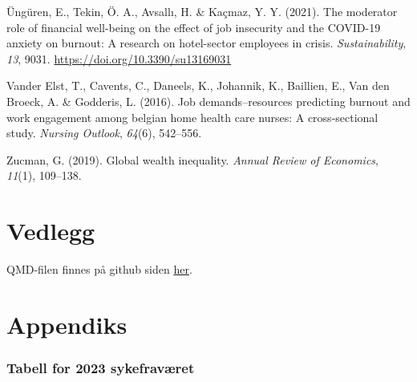 \documentclass[
  12pt,
  a4paper,
  DIV=11,
  numbers=noendperiod]{scrartcl}
\newlength{\cslhangindent}
\newenvironment{CSLReferences}[2] %
 {\begin{list}{}{%
  \setlength{\itemindent}{0pt}
  \setlength{\leftmargin}{0pt}
  \setlength{\parsep}{0pt}
  \ifodd #1
   \setlength{\leftmargin}{\cslhangindent}
   \setlength{\itemindent}{-1\cslhangindent}
  \fi
  \setlength{\itemsep}{#2\baselineskip}}}
 {\end{list}}
\begin{document}
\begin{CSLReferences}{1}{0}
Üngüren, E., Tekin, Ö. A., Avsallı, H. \& Kaçmaz, Y. Y. (2021). The
moderator role of financial well-being on the effect of job insecurity
and the COVID-19 anxiety on burnout: A research on hotel-sector
employees in crisis. \emph{Sustainability}, \emph{13}, 9031.
\url{https://doi.org/10.3390/su13169031}

Vander Elst, T., Cavents, C., Daneels, K., Johannik, K., Baillien, E.,
Van den Broeck, A. \& Godderis, L. (2016). Job demands--resources
predicting burnout and work engagement among belgian home health care
nurses: A cross-sectional study. \emph{Nursing Outlook}, \emph{64}(6),
542--556.

Zucman, G. (2019). Global wealth inequality. \emph{Annual Review of
Economics}, \emph{11}(1), 109--138.

\end{CSLReferences}

\newpage

\section*{Vedlegg}\label{vedlegg}

QMD-filen finnes på github siden
\href{https://github.com/Danieljoha/SOK-2209/blob/main/kand_SOK2209_Bacheloroppgave_V25.qmd}{her}.

\section*{Appendiks}\label{appendiks}

\subsubsection{Tabell for 2023
sykefraværet}\label{tabell-for-2023-sykefravuxe6ret}
\end{document}
